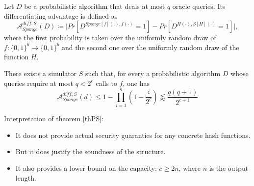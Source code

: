 \begin{definition}
    Let $D$ be a probabilistic algorithm that deals at most $q$ oracle queries. Its differentiating advantage is defined as
    $$\mathcal{A}_{Sponge}^{diff,S}(D) \coloneq \vert Pr[D^{Sponge[f](\cdot),f(\cdot)}=1]-Pr[D^{H(\cdot),S[H](\cdot)}=1] \vert,$$
    where the first probability is taken over the uniformly random draw of $f: \{0,1\}^b \to \{0,1\}^b$ and the second one over the uniformly random draw of the function $H$.
\end{definition}

\begin{theorem}\label{thPS}
There exists a simulator $S$ such that, for every a probabilistic algorithm $D$ whose queries require at most $q < 2^c$ calls to $f$, one has
$$\mathcal{A}_{Sponge}^{diff,S}(d) \leq 1 - \prod\limits_{i=1}^q (1 - \frac{i}{2^c}) \lessapprox \frac{q(q+1)}{2^{c+1}}$$
\end{theorem}

Interpretation of theorem \ref{thPS}:
\begin{itemize}
    \item It does not provide actual security guaranties for any concrete hash functions.
    \item But it does justify the soundness of the structure.
    \item It also provides a lower bound on the capacity: $c \geq 2n$, where $n$ is the output length.\newline
\end{itemize}


